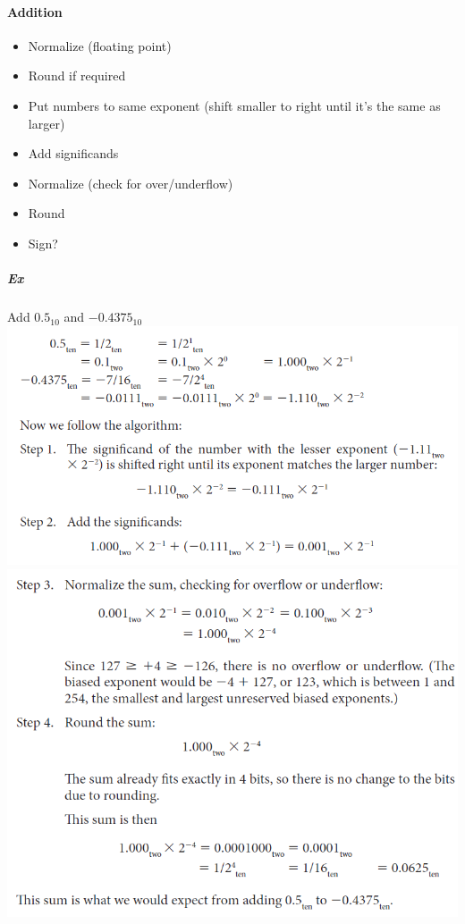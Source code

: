 \documentclass[12 pt]{article}
\begin{document}
	\paragraph{Addition}
	\begin{itemize}
		\item Normalize (floating point)
		\item Round if required
		\item Put numbers to same exponent (shift smaller to right until it's the same as larger)
		\item Add significands
		\item Normalize (check for over/underflow)
		\item Round
		\item Sign?
		\end{itemize}
	\subparagraph{Ex} Add $0.5_{10}$ and $-0.4375_{10}$
	\\
	\includegraphics[scale=0.8]{exfa}\\
	\includegraphics[scale=0.8]{exfaa}
\end{document}
